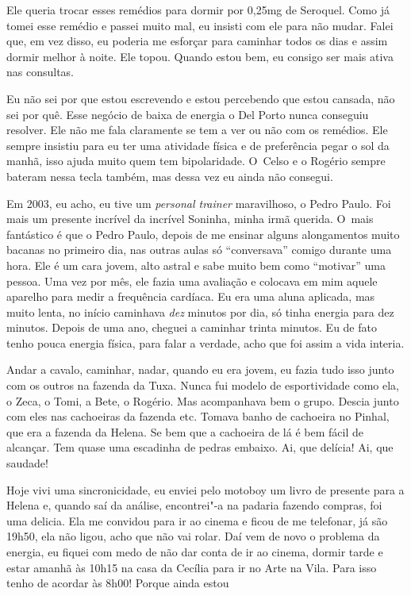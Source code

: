 Ele queria trocar esses remédios para dormir por 0,25mg de Seroquel.
Como já tomei esse remédio e passei muito mal, eu insisti com ele para
não mudar. Falei que, em vez disso, eu poderia me esforçar para caminhar
todos os dias e assim dormir melhor à noite. Ele topou. Quando estou
bem, eu consigo ser mais ativa nas consultas.

Eu não sei por que estou escrevendo e estou percebendo que estou
cansada, não sei por quê. Esse negócio de baixa de energia o Del Porto
nunca conseguiu resolver. Ele não me fala claramente se tem a ver ou não
com os remédios. Ele sempre insistiu para eu ter uma atividade física e
de preferência pegar o sol da manhã, isso ajuda muito quem tem
bipolaridade. O~Celso e o Rogério sempre bateram nessa tecla também, mas
dessa vez eu ainda não consegui.

Em 2003, eu acho, eu tive um \emph{personal trainer} maravilhoso, o
Pedro Paulo. Foi mais um presente incrível da incrível Soninha, minha
irmã querida. O~mais fantástico é que o Pedro Paulo, depois de me
ensinar alguns alongamentos muito bacanas no primeiro dia, nas outras
aulas só ``conversava'' comigo durante uma hora. Ele é um cara jovem,
alto astral e sabe muito bem como ``motivar'' uma pessoa. Uma vez por
mês, ele fazia uma avaliação e colocava em mim aquele aparelho para
medir a frequência cardíaca. Eu era uma aluna aplicada, mas muito lenta,
no início caminhava \emph{dez} minutos por dia, só tinha energia para
dez minutos. Depois de uma ano, cheguei a caminhar trinta minutos. Eu de
fato tenho pouca energia física, para falar a verdade, acho que foi
assim a vida interia.

Andar a cavalo, caminhar, nadar, quando eu era jovem, eu fazia tudo isso
junto com os outros na fazenda da Tuxa. Nunca fui modelo de
esportividade como ela, o Zeca, o Tomi, a Bete, o Rogério. Mas
acompanhava bem o grupo. Descia junto com eles nas cachoeiras da fazenda
etc. Tomava banho de cachoeira no Pinhal, que era a fazenda da Helena.
Se bem que a cachoeira de lá é bem fácil de alcançar. Tem quase uma
escadinha de pedras embaixo. Ai, que delícia! Ai, que saudade!

Hoje vivi uma sincronicidade, eu enviei pelo motoboy um livro de
presente para a Helena e, quando saí da análise, encontrei"-a na padaria
fazendo compras, foi uma delicia. Ela me convidou para ir ao cinema e
ficou de me telefonar, já são 19h50, ela não ligou, acho que não vai
rolar. Daí vem de novo o problema da energia, eu fiquei com medo de não
dar conta de ir ao cinema, dormir tarde e estar amanhã às 10h15 na casa
da Cecília para ir no Arte na Vila. Para isso tenho de acordar às 8h00!
Porque ainda estou


